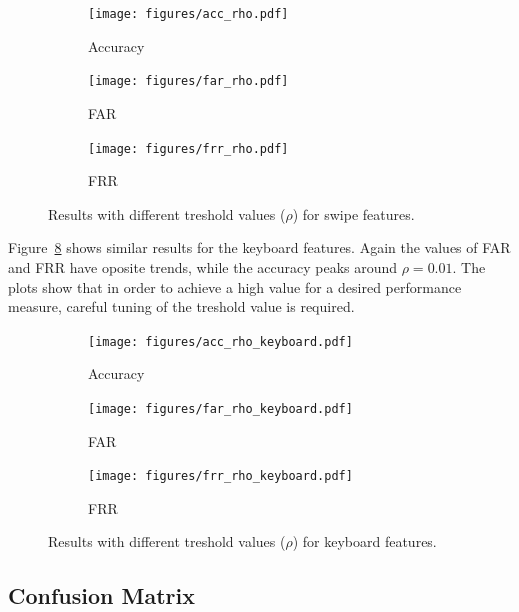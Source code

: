 \documentclass{llncs}
\begin{document}
\begin{figure}[!t]
    \centering
    \begin{subfigure}{0.32\textwidth}
        \texttt{[image: figures/acc\_rho.pdf]}
        \caption{Accuracy}
        \label{fig:accuracy}
    \end{subfigure}
    \hfill
    \begin{subfigure}{0.32\textwidth}
        \texttt{[image: figures/far\_rho.pdf]}
        \caption{FAR}
        \label{fig:far}
    \end{subfigure}
    \hfill
    \begin{subfigure}{0.32\textwidth}
        \texttt{[image: figures/frr\_rho.pdf]}
        \caption{FRR}
        \label{fig:frr}
    \end{subfigure}
    \caption{Results with different treshold values ($\rho$) for swipe features.}\label{fig:rho_test}
\end{figure}

Figure~\ref{fig:rho_test_keyboard} shows similar results for the keyboard features. Again the values of FAR and FRR have oposite trends, while the accuracy peaks around $\rho=0.01$. The plots show that in order to achieve a high value for a desired performance measure, careful tuning of the treshold value is required.

\begin{figure}[!t]
    \centering
    \begin{subfigure}{0.32\textwidth}
        \texttt{[image: figures/acc\_rho\_keyboard.pdf]}
        \caption{Accuracy}
        \label{fig:accuracy}
    \end{subfigure}
    \hfill
    \begin{subfigure}{0.32\textwidth}
        \texttt{[image: figures/far\_rho\_keyboard.pdf]}
        \caption{FAR}
        \label{fig:far}
    \end{subfigure}
    \hfill
    \begin{subfigure}{0.32\textwidth}
        \texttt{[image: figures/frr\_rho\_keyboard.pdf]}
        \caption{FRR}
        \label{fig:frr}
    \end{subfigure}
    \caption{Results with different treshold values ($\rho$) for keyboard features.}\label{fig:rho_test_keyboard}
\end{figure}

\subsection{Confusion Matrix}
\end{document}
